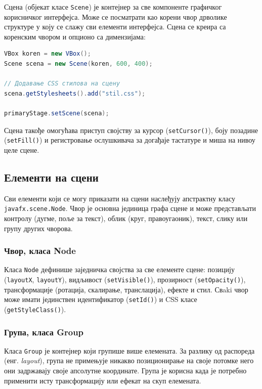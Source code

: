 Сцена (објекат класе \texttt{Scene}) је контејнер за све компоненте графичког корисничког интерфејса. Може се посматрати као корени чвор дрволике структуре у коју се слажу сви елементи интерфејса. Сцена се креира са коренским чвором и опционо са димензијама:


\begin{lstlisting}[language=Java]
VBox koren = new VBox();
Scene scena = new Scene(koren, 600, 400);
 
// Додавање CSS стилова на сцену
scena.getStylesheets().add("stil.css");
 
primaryStage.setScene(scena);
\end{lstlisting}


Сцена такође омогућава приступ својству за курсор (\texttt{setCursor()}), боју позадине (\texttt{setFill()}) и регистровање ослушкивача за догађаје тастатуре и миша на нивоу целе сцене.


\subsection{Елементи на сцени}

Сви елементи који се могу приказати на сцени наслеђују апстрактну класу \texttt{javafx.scene.Node}. Чвор је основна јединица графа сцене и може представљати контролу (дугме, поље за текст), облик (круг, правоугаоник), текст, слику или групу других чворова.

\subsubsection{Чвор, класа Node}

Класа \texttt{Node} дефинише заједничка својства за све елементе сцене: позицију (\texttt{layoutX}, \texttt{layoutY}), видљивост (\texttt{setVisible()}), прозирност (\texttt{setOpacity()}), трансформације (ротација, скалирање, транслација), ефекте и стил. Свaki чвор може имати јединствен идентификатор (\texttt{setId()}) и CSS класе (\texttt{getStyleClass()}).

\subsubsection{Група, класа Group}

Класа \texttt{Group} је контејнер који групише више елемената. За разлику од распореда (енг. \textit{layout}), група не примењује никакво позиционирање на своје потомке него они задржавају своје апсолутне координате. Група је корисна када је потребно применити исту трансформацију или ефекат на скуп елемената.

